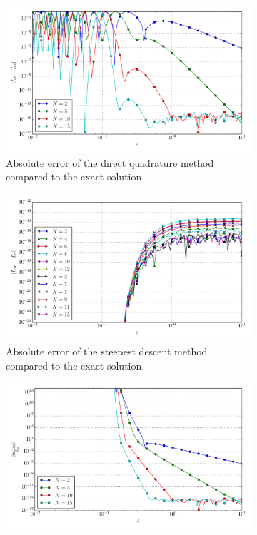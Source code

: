 \documentclass[a4paper,10pt]{article}
\begin{document}
\begin{figure}[ht!]
\begin{subfigure}[t]{0.5\linewidth}
    \includegraphics[width=\linewidth]{./plots/tp_4d_conv_eps_(0,0,0,0)_(0,0,0,0)_err_qr.pdf}
    \caption{Absolute error of the direct quadrature method compared to the exact solution.}
    \label{fig:tp_4d_conv_eps_0000_0000_err_qr}
  \end{subfigure}
  \begin{subfigure}[t]{0.5\linewidth}
    \includegraphics[width=\linewidth]{./plots/tp_4d_conv_eps_(0,0,0,0)_(0,0,0,0)_err_nsd.pdf}
    \caption{Absolute error of the steepest descent method compared to the exact solution.}
    \label{fig:tp_4d_conv_eps_0000_0000_err_nsd}
  \end{subfigure}
  \begin{subfigure}[t]{0.5\linewidth}
    \includegraphics[width=\linewidth]{./plots/tp_4d_conv_eps_(0,0,0,0)_(0,0,0,0)_err_rel_qr.pdf}

\end{subfigure}
\end{figure}
\end{document}

